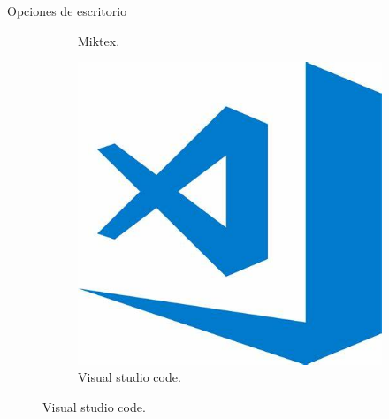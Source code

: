 \documentclass[aspectratio=169, 10pt]{beamer}
\begin{document}
\begin{frame}{Opciones de escritorio}
\begin{figure}
\begin{figure}
\begin{minipage}{0.10\textwidth}
        \caption*{Miktex.}
    \end{minipage}\hfill
    \begin{minipage}{0.10\textwidth}
        \includegraphics[scale=0.060]{Visual_studio_code.jpg} 
        \caption*{Visual studio code.}
    \end{minipage}
    \end{figure}
\end{figure}
\end{frame}
\end{document}
